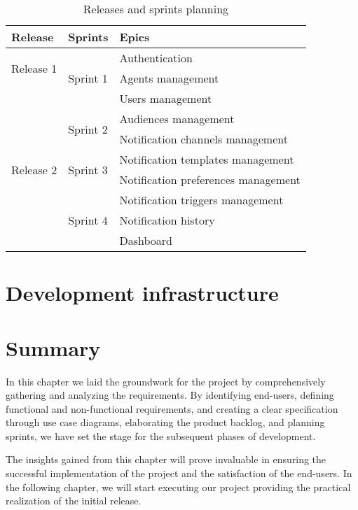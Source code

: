 \begin{table}[hbt!]
    \begin{tabular}{ | m{} | m{} | m{} | }
        \hline
        \textbf{Release} & \textbf{Sprints} & \textbf{Epics} \\
        \hline
        \multirow{2}{5em}{Release 1} 
            & \multirow{3}{5em}{Sprint 1} & Authentication \\
            \cline{3-3}
            & & Agents management \\
            \cline{3-3}
            & & Users management \\
            \cline{2-3}

            & \multirow{2}{5em}{Sprint 2} & Audiences management \\
            \cline{3-3}
            & & Notification channels management \\
        \hline
        \multirow{2}{5em}{Release 2} & \multirow{2}{5em}{Sprint 3} & Notification templates management \\
        \cline{3-3}
        & & Notification preferences management \\
        \cline{2-3}
        & \multirow{3}{5em}{Sprint 4} & Notification triggers management \\
        \cline{3-3}
        & & Notification history \\
        \cline{3-3}
        & & Dashboard \\
        \hline
    \end{tabular}
    \caption{Releases and sprints planning}
    \label{tab:planning}
\end{table}

\section{Development infrastructure}

\pagebreak
{}
\section*{Summary}
In this chapter we laid the groundwork for the project by comprehensively gathering and analyzing 
the requirements. By identifying end-users, defining functional and non-functional requirements, 
and creating a clear specification through use case diagrams, elaborating the product backlog, 
and planning sprints, we have set the stage for the subsequent phases of development. 

The insights gained from this chapter will prove invaluable in ensuring the successful implementation 
of the project and the satisfaction of the end-users. In the following chapter, we will start executing 
our project providing the practical realization of the initial release.

